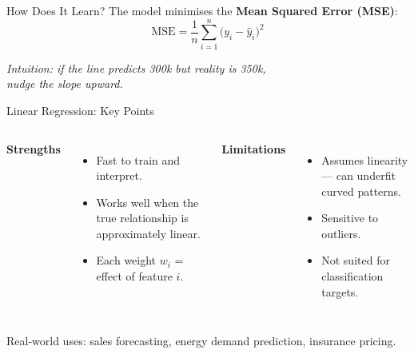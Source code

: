 \documentclass[10pt]{beamer}
\begin{document}
\begin{frame}{How Does It Learn?}
    The model minimises the \textbf{Mean Squared Error (MSE)}:
    \[
      \text{MSE} = \frac{1}{n}\sum_{i=1}^{n}\bigl(y_i - \hat{y}_i\bigr)^2
    \]

    \vspace{0.2cm}
    \begin{center}
    \end{center}

    \vspace{0.2cm}
    \textit{Intuition: if the line predicts 300k but reality is 350k,\\
    nudge the slope upward.}
\end{frame}

\begin{frame}{Linear Regression: Key Points}
    \begin{columns}[T,onlytextwidth]
        \textbf{Strengths}
        \begin{itemize}
            \item Fast to train and interpret.
            \item Works well when the true relationship is approximately linear.
            \item Each weight $w_i$ = effect of feature $i$.
        \end{itemize}
        \textbf{Limitations}
        \begin{itemize}
            \item Assumes linearity — can underfit curved patterns.
            \item Sensitive to outliers.
            \item Not suited for classification targets.
        \end{itemize}
    \end{columns}
    \vspace{0.3cm}
    Real-world uses: sales forecasting, energy demand prediction, insurance pricing.
\end{frame}
\end{document}
